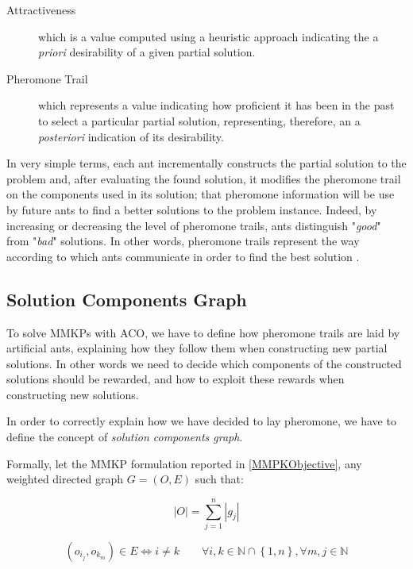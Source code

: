 \documentclass[12pt,a4paper]{report}
\newcommand{\N}{\mathbb{N}}
\begin{document}
\begin{description}
	\item[Attractiveness] which is a value computed using a heuristic approach indicating the a \textit{priori} desirability of a given partial solution.
	
	\item[Pheromone Trail] which represents a value indicating how proficient it has been in the past to select a particular partial solution, representing, therefore, an a \textit{posteriori} indication of its desirability.
\end{description} 

In very simple terms, each ant incrementally constructs the partial solution to the problem and, after evaluating the found solution, it modifies the pheromone trail on the components used in its solution; that pheromone information will be use by future ants to find a better solutions to the problem instance. Indeed, by increasing or decreasing the level of pheromone trails, ants distinguish "\textit{good}" from "\textit{bad}" solutions. In other words, pheromone trails represent the way according to which ants communicate in order to find the best solution \citet{acogrosso}\cite{MAXMIN}.
 
\subsection{Solution Components Graph}

To solve MMKPs with ACO, we have to define how pheromone trails are laid by artificial ants, explaining how they follow them when constructing new partial solutions. In other words we need to decide which components of the constructed solutions should be rewarded, and how to exploit these rewards when constructing new solutions.

In order to correctly explain how we have decided to lay pheromone, we have to define the concept of \textit{solution components graph}.

Formally, let the MMKP formulation reported in \ref{MMPKObjective}, any weighted directed graph $G=(O,E)$ such that:

\begin{equation}
	|O| = \sum_{j=1}^n |g_j|
\end{equation}

\begin{equation}
	(o_{i_j}, o_{k_m}) \in E \Leftrightarrow i \neq k \qquad \forall i,k \in \N \cap \left\{1,n\right\}, \forall m,j \in \N
\end{equation}
\end{document}
